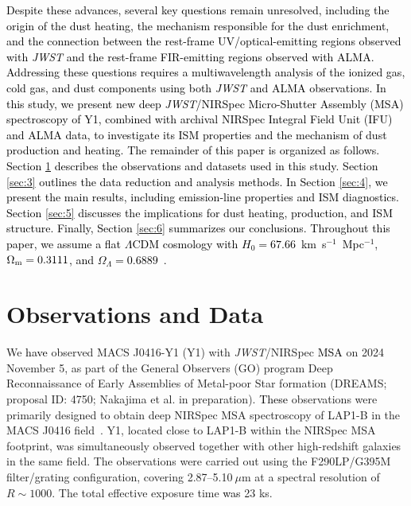 \documentclass[trackchanges,twocolumn]{aastex701}
\newcommand{\ca}[1]{\textcolor{black}{#1}} %
\newcommand{\cb}[1]{\textcolor{black}{#1}} %
\newcommand{\cc}[1]{\textcolor{black}{#1}} %
\newcommand{\cd}[1]{\textcolor{black}{#1}} %
\newcommand{\cg}[1]{\textcolor{black}{#1}} %
\newcommand{\ckt}[1]{\textcolor{black}{#1}}
\newcommand{\cl}[1]{\textcolor{black}{#1}}
\newcommand{\cn}[1]{\textcolor{black}{#1}}
\newcommand{\co}[1]{\textcolor{black}{#1}}
\begin{document}
\ckt{Despite these advances, several key questions remain unresolved, \cn{including the origin of the dust heating, the mechanism responsible for the dust enrichment, and the connection between the rest-frame UV/optical-emitting regions observed with \textit{JWST} and the rest-frame FIR-emitting regions observed with ALMA. Addressing these questions requires a multiwavelength analysis of the ionized gas, cold gas, and dust components using both \textit{JWST} and ALMA observations.} In this study, we present new deep \textit{JWST}/NIRSpec \cg{Micro-Shutter Assembly (MSA)} spectroscopy of Y1, combined with archival \cg{NIRSpec Integral Field Unit (IFU)} and ALMA data, to investigate its ISM properties and the mechanism of dust production and heating.}
\cc{The remainder of this paper is organized as follows. Section \ref{sec:2} describes the observations and datasets used in this study. Section \ref{sec:3} outlines the data reduction and analysis methods. In Section \ref{sec:4}, we present the main results, including emission-line properties and ISM diagnostics. Section \ref{sec:5} discusses the implications for dust heating, production, and ISM structure. Finally, Section \ref{sec:6} summarizes our conclusions.} \cl{Throughout this paper, we assume a flat $\Lambda$CDM cosmology with $H_0=67.66$~km~s$^{-1}$~Mpc$^{-1}$, $\Omega_{\rm m}=0.3111$, and $\Omega_{\Lambda}=0.6889$~\citep{Planck2020}. }



\section{Observations and Data}
\label{sec:2}

We \cd{have} observed MACS J0416-Y1 (Y1) with \textit{JWST}/NIRSpec \cl{MSA} on 2024 November 5, as part of the General Observers (GO) program Deep Reconnaissance of Early Assemblies of Metal-poor Star formation (DREAMS; proposal ID: 4750; Nakajima et al. in preparation). 
\cd{These} observations were primarily designed to obtain deep NIRSpec MSA spectroscopy of LAP1-B in the MACS J0416 field~\ca{\citep{Nakajima2025}}. Y1, located close to LAP1-B within the NIRSpec MSA footprint, was simultaneously observed together with other high-redshift galaxies in the same field. The observations were carried out using the F290LP/G395M filter/grating configuration, covering 2.87--5.10$~\mu$m at a spectral resolution of $R\sim 1000$. The total effective exposure time \cd{was} 23 ks. 
\end{document}

